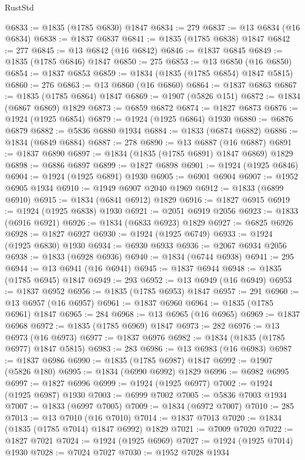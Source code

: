 \begin{lexlean}{RustStd}
\begin{coremodule}
@6833 := @1835 (@1785 @6830) @1847
@6834 := 279
@6837 := @13 @6834 (@16 @6834)
@6838 := @1837 @6837
@6841 := @1835 (@1785 @6838) @1847
@6842 := 277
@6845 := @13 @6842 (@16 @6842)
@6846 := @1837 @6845
@6849 := @1835 (@1785 @6846) @1847
@6850 := 275
@6853 := @13 @6850 (@16 @6850)
@6854 := @1837 @6853
@6859 := @1834 (@1835 (@1785 @6854) @1847 @5815)
@6860 := 276
@6863 := @13 @6860 (@16 @6860)
@6864 := @1837 @6863
@6867 := @1835 (@1785 @6864) @1847
@6869 := @1907 (@5826 @151)
@6872 := @1834 (@6867 @6869) @1829
@6873 := @6859 @6872
@6874 := @1827 @6873
@6876 := @1924 (@1925 @6854)
@6879 := @1924 (@1925 @6864) @1930
@6880 := @6876 @6879
@6882 := @5836 @6880 @1934
@6884 := @1833 (@6874 @6882)
@6886 := @1834 (@6849 @6884)
@6887 := 278
@6890 := @13 @6887 (@16 @6887)
@6891 := @1837 @6890
@6897 := @1834 (@1835 (@1785 @6891) @1847 @6869) @1829
@6898 := @6886 @6897
@6899 := @1827 @6898
@6901 := @1924 (@1925 @6846)
@6904 := @1924 (@1925 @6891) @1930
@6905 := @6901 @6904
@6907 := @1952 @6905 @1934
@6910 := @1949 @6907 @2040 @1969
@6912 := @1833 (@6899 @6910)
@6915 := @1834 (@6841 @6912) @1829
@6916 := @1827 @6915
@6919 := @1924 (@1925 @6838) @1930
@6921 := @2051 @6919 @2056
@6923 := @1833 (@6916 @6921)
@6926 := @1834 (@6833 @6923) @1829
@6927 := @6825 @6926
@6928 := @1827 @6927
@6930 := @1924 (@1925 @6749)
@6933 := @1924 (@1925 @6830) @1930
@6934 := @6930 @6933
@6936 := @2067 @6934 @2056
@6938 := @1833 (@6928 @6936)
@6940 := @1834 (@6744 @6938)
@6941 := 295
@6944 := @13 @6941 (@16 @6941)
@6945 := @1837 @6944
@6948 := @1835 (@1785 @6945) @1847
@6949 := 293
@6952 := @13 @6949 (@16 @6949)
@6953 := @1837 @6952
@6956 := @1835 (@1785 @6953) @1847
@6957 := 291
@6960 := @13 @6957 (@16 @6957)
@6961 := @1837 @6960
@6964 := @1835 (@1785 @6961) @1847
@6965 := 284
@6968 := @13 @6965 (@16 @6965)
@6969 := @1837 @6968
@6972 := @1835 (@1785 @6969) @1847
@6973 := 282
@6976 := @13 @6973 (@16 @6973)
@6977 := @1837 @6976
@6982 := @1834 (@1835 (@1785 @6977) @1847 @5815)
@6983 := 283
@6986 := @13 @6983 (@16 @6983)
@6987 := @1837 @6986
@6990 := @1835 (@1785 @6987) @1847
@6992 := @1907 (@5826 @180)
@6995 := @1834 (@6990 @6992) @1829
@6996 := @6982 @6995
@6997 := @1827 @6996
@6999 := @1924 (@1925 @6977)
@7002 := @1924 (@1925 @6987) @1930
@7003 := @6999 @7002
@7005 := @5836 @7003 @1934
@7007 := @1833 (@6997 @7005)
@7009 := @1834 (@6972 @7007)
@7010 := 285
@7013 := @13 @7010 (@16 @7010)
@7014 := @1837 @7013
@7020 := @1834 (@1835 (@1785 @7014) @1847 @6992) @1829
@7021 := @7009 @7020
@7022 := @1827 @7021
@7024 := @1924 (@1925 @6969)
@7027 := @1924 (@1925 @7014) @1930
@7028 := @7024 @7027
@7030 := @1952 @7028 @1934

\end{coremodule}
\end{lexlean}
